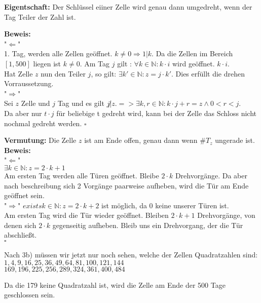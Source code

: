 \documentclass[11pt,a4paper,ngerman]{article}
\newcommand{\N}{\mathbb{N}}
\begin{document}
\vspace{30px}

\textbf{Eigentschaft:} Der Schlüssel eiiner Zelle wird genau dann umgedreht, wenn der Tag Teiler der Zahl ist.

\textbf{Beweis:} \\
"$\Leftarrow$"\\
1. Tag, werden alle Zellen geöffnet. $k\not= 0 \Rightarrow 1 | k $. Da die Zellen im Bereich $[1,500]$ liegen ist $k \not= 0$.
Am Tag $j$ gilt : $\forall k\in \N : k\cdot i$ wird geöffnet. $k \cdot i$.\\
Hat Zelle $z$ nun den Teiler $j$, so gilt: $\exists k' \in \N : z = j \cdot k'$. Dies erfüllt die drehen Vorraussetzung.\\
"$\Rightarrow$"\\
Sei $z$ Zelle und $j$ Tag und es gilt $j \not | z. => \exists k,r \in \N : k\cdot j + r = z \land 0<r<j$.\\
Da aber nur $t\cdot j$ für beliebige t gedreht wird, kann bei der Zelle das Schloss nicht nochmal gedreht werden.
\mbox{} \hfill $\square$


\vspace{10px}

\textbf{Vermutung:} Die Zelle $z$ ist am Ende offen, genau dann wenn $\#T_z$ ungerade ist.\\
\textbf{Beweis:}\\
"$\Leftarrow$"\\
$\exists k \in \N : z = 2 \cdot k + 1$\\
Am ersten Tag werden alle Türen geöffnet. Bleibe $2\cdot k$ Drehvorgänge. Da aber nach beschreibung sich 2 Vorgänge paarweise aufheben,
wird die Tür am Ende geöffnet sein.\\
"$\Rightarrow$"
$exists k \in \N : z = 2 \cdot k + 2$ ist möglich, da 0 keine unserer Türen ist.\\
Am ersten Tag wird die Tür wieder geöffnet. Bleiben $2\cdot k +1$ Drehvorgänge, von denen sich $2\cdot k$ gegenseitig aufheben. Bleib uns ein Drehvorgang, der die Tür abschließt.\\
\mbox{} \hfill $\square$

\vspace{15px}

Nach 3b) müssen wir jetzt nur noch sehen, welche der Zellen Quadratzahlen sind:
$1, 4, 9, 16, 25, 36, 49, 64, 81, 100, 121, 144$\\
$169, 196, 225, 256, 289, 324, 361, 400, 484$

\vspace{10px}

Da die 179 keine Quadratzahl ist, wird die Zelle am Ende der 500 Tage geschlossen sein.


\label{LastPage}
\end{document}
